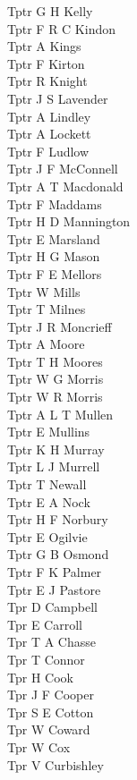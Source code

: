 \begin{multicols}{2}
  Tptr G H Kelly \\
  Tptr F R C Kindon \\
  Tptr A Kings \\
  Tptr F Kirton \\
  Tptr R Knight \\
  Tptr J S Lavender \\
  Tptr A Lindley \\
  Tptr A Lockett \\
  Tptr F Ludlow \\
  Tptr J F McConnell \\
  Tptr A T Macdonald \\
  Tptr F Maddams \\
  Tptr H D Mannington \\
  Tptr E Marsland \\
  Tptr H G Mason \\
  Tptr F E Mellors \\
  Tptr W Mills \\
  Tptr T Milnes \\
  Tptr J R Moncrieff \\
  Tptr A Moore \\
  Tptr T H Moores \\
  Tptr W G Morris \\
  Tptr W R Morris \\
  Tptr A L T Mullen \\
  Tptr E Mullins \\
  Tptr K H Murray \\
  Tptr L J Murrell \\
  Tptr T Newall \\
  Tptr E A Nock \\
  Tptr H F Norbury \\
  Tptr E Ogilvie \\
  Tptr G B Osmond \\
  Tptr F K Palmer \\
  Tptr E J Pastore \\
  Tpr D Campbell \\
  Tpr E Carroll \\
  Tpr T A Chasse \\
  Tpr T Connor \\
  Tpr H Cook \\
  Tpr J F Cooper \\
  Tpr S E Cotton \\
  Tpr W Coward \\
  Tpr W Cox \\
  Tpr V Curbishley \\

\end{multicols}
